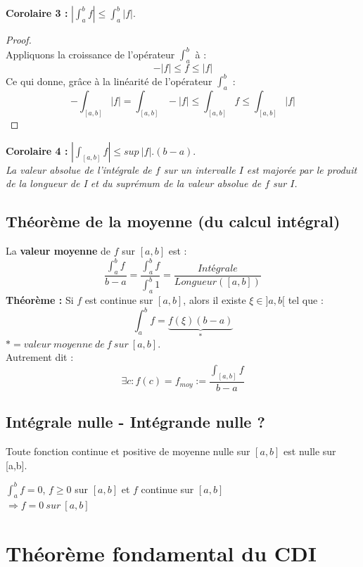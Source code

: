 \documentclass[11pt, a4paper, openany]{book}
\begin{document}
\textbf{Corolaire 3 :} $|\int_a^b f| \leq \int_a^b |f|$.

\begin{proof}\ \\
	Appliquons la croissance de l'opérateur $\int_a^b$ à :
	$$-|f| \leq f \leq |f|$$
	Ce qui donne, grâce à la linéarité de l'opérateur $\int_a^b$ :
	$$- \int_{[a,b]} |f| = \int_{[a,b]} -|f| \leq \int_{[a,b]} f \leq \int_{[a,b]} |f|$$
\end{proof}

\textbf{Corolaire 4 :} $|\int_{[a,b]} f| \leq sup\ |f|.(b-a)$. \\
\textit{La valeur absolue de l'intégrale de $f$ sur un intervalle $I$ est majorée par le produit de la longueur de I et du suprémum de la valeur absolue de $f$ sur $I$.}

\subsection{Théorème de la moyenne (du calcul intégral)}
La \textbf{valeur moyenne} de $f$ sur $[a,b]$ est  :
$$\frac{\int_a^b f}{b-a} = \frac{\int_a^b f}{\int_a^b 1} = \frac{Intégrale}{Longueur([a,b])}$$
\textbf{Théorème :} Si $f$ est continue sur $[a,b]$, alors il existe $\xi \in ]a,b[$ tel que :
$$\int_a^b f = \underbrace{f(\xi)(b-a)}_{*}$$
$* = valeur\ moyenne\ de\ f\ sur\ [a,b]$.\\
Autrement dit : 
$$\exists c : f(c) = f_{moy} := \frac{\int_{[a,b]} f}{b-a}$$

\subsection{Intégrale nulle - Intégrande nulle ?}
Toute fonction continue et positive de moyenne nulle sur $[a,b]$ est nulle sur [a,b].
\begin{center}
	$\int_a^b f = 0$, $f \geq 0$ sur $[a,b]$ et $f$ continue sur $[a,b]$\\
	$\Rightarrow f = 0\ sur\ [a,b]$
	
\end{center}

\section{Théorème fondamental du CDI}
\end{document}
